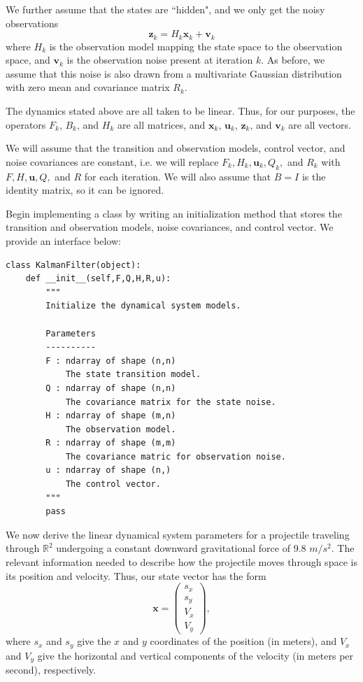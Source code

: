 We further assume that the states are ``hidden", and we only get the noisy observations
\begin{equation}
\mathbf{z}_{k} = H_{k}\mathbf{x}_{k} + \mathbf{v}_{k}
\label{eq:obs}
\end{equation}
where $H_{k}$ is the observation model mapping the state space to the observation space, and $\mathbf{v}_{k}$ is the observation noise present at iteration $k$.
As before, we assume that this noise is also drawn from a multivariate Gaussian distribution with zero mean and covariance matrix $R_{k}$.

The dynamics stated above are all taken to be linear.
Thus, for our purposes, the operators $F_k$, $B_k$, and $H_k$ are all matrices, and $\mathbf{x}_k$, $\mathbf{u}_k$, $\mathbf{z}_k$, and $\mathbf{v}_k$ are all vectors.

We will assume that the transition and observation models, control vector, and noise covariances are constant, i.e. we will replace $F_{k}, H_k, \mathbf{u}_{k}, Q_{k},$ and $R_{k}$ with $F, H, \mathbf{u}, Q,$ and $R$ for each iteration.
We will also assume that $B = I$ is the identity matrix, so it can be ignored.

\begin{problem}
Begin implementing a  class by writing an initialization method that stores the transition and observation models, noise covariances, and control vector.
We provide an interface below:
\begin{lstlisting}
class KalmanFilter(object):
    def __init__(self,F,Q,H,R,u):
        """
        Initialize the dynamical system models.

        Parameters
        ----------
        F : ndarray of shape (n,n)
            The state transition model.
        Q : ndarray of shape (n,n)
            The covariance matrix for the state noise.
        H : ndarray of shape (m,n)
            The observation model.
        R : ndarray of shape (m,m)
            The covariance matric for observation noise.
        u : ndarray of shape (n,)
            The control vector.
        """
        pass
\end{lstlisting}
\end{problem}

We now derive the linear dynamical system parameters for a projectile traveling through $\mathbb{R}^2$ undergoing a constant downward gravitational force of 9.8 $m/s^2$. 
The relevant information needed to describe how the projectile moves through space is its position and velocity.
Thus, our state vector has the form
\[
\mathbf{x} = \left( \begin{array}{c} s_{x} \\ s_{y} \\ V_{x} \\ V_{y} \end{array} \right),
\]
where $s_x$ and $s_y$ give the $x$ and $y$ coordinates of the position (in meters), and $V_x$ and $V_y$ give the horizontal and vertical components of the velocity (in meters per second), respectively.

